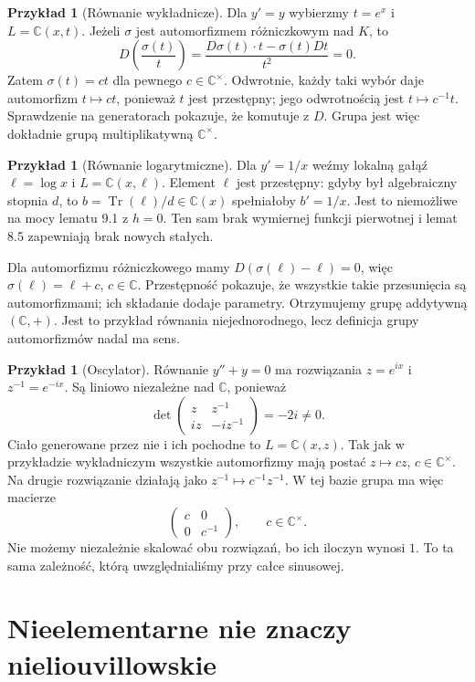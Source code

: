 \documentclass[11pt,a4paper,oneside]{book}
\numberwithin{equation}{section}
\theoremstyle{plain}
\theoremstyle{definition}
\newtheorem{przyklad}[twierdzenie]{Przykład}
\theoremstyle{remark}
\newcommand{\C}{\mathbb{C}}
\newcommand{\Tr}{\operatorname{Tr}}
\begin{document}
\begin{przyklad}[Równanie wykładnicze]
Dla $y'=y$ wybierzmy $t=e^x$ i $L=\C(x,t)$. Jeżeli $\sigma$ jest automorfizmem różniczkowym nad $K$, to
\[
D\left(\frac{\sigma(t)}{t}\right)
=\frac{D\sigma(t)\cdot t-\sigma(t)Dt}{t^2}=0.
\]
Zatem $\sigma(t)=ct$ dla pewnego $c\in\C^\times$. Odwrotnie, każdy taki wybór daje automorfizm $t\mapsto ct$, ponieważ $t$ jest przestępny; jego odwrotnością jest $t\mapsto c^{-1}t$. Sprawdzenie na generatorach pokazuje, że komutuje z $D$. Grupa jest więc dokładnie grupą multiplikatywną $\C^\times$.
\end{przyklad}

\begin{przyklad}[Równanie logarytmiczne]
Dla $y'=1/x$ weźmy lokalną gałąź $\ell=\log x$ i $L=\C(x,\ell)$. Element $\ell$ jest przestępny: gdyby był algebraiczny stopnia $d$, to $b=\Tr(\ell)/d\in\C(x)$ spełniałoby $b'=1/x$. Jest to niemożliwe na mocy lematu 9.1 z $h=0$. Ten sam brak wymiernej funkcji pierwotnej i lemat 8.5 zapewniają brak nowych stałych.

Dla automorfizmu różniczkowego mamy $D(\sigma(\ell)-\ell)=0$, więc $\sigma(\ell)=\ell+c$, $c\in\C$. Przestępność pokazuje, że wszystkie takie przesunięcia są automorfizmami; ich składanie dodaje parametry. Otrzymujemy grupę addytywną $(\C,+)$. Jest to przykład równania niejednorodnego, lecz definicja grupy automorfizmów nadal ma sens.
\end{przyklad}

\begin{przyklad}[Oscylator]
Równanie $y''+y=0$ ma rozwiązania $z=e^{ix}$ i $z^{-1}=e^{-ix}$. Są liniowo niezależne nad $\C$, ponieważ
\[
\det\begin{pmatrix}z&z^{-1}\\iz&-iz^{-1}\end{pmatrix}=-2i\ne0.
\]
Ciało generowane przez nie i ich pochodne to $L=\C(x,z)$. Tak jak w przykładzie wykładniczym wszystkie automorfizmy mają postać $z\mapsto cz$, $c\in\C^\times$. Na drugie rozwiązanie działają jako $z^{-1}\mapsto c^{-1}z^{-1}$. W tej bazie grupa ma więc macierze
\[
\begin{pmatrix}c&0\\0&c^{-1}\end{pmatrix},\qquad c\in\C^\times.
\]
Nie możemy niezależnie skalować obu rozwiązań, bo ich iloczyn wynosi $1$. To ta sama zależność, którą uwzględnialiśmy przy całce sinusowej.
\end{przyklad}

\section{Nieelementarne nie znaczy nieliouvillowskie}
\end{document}
